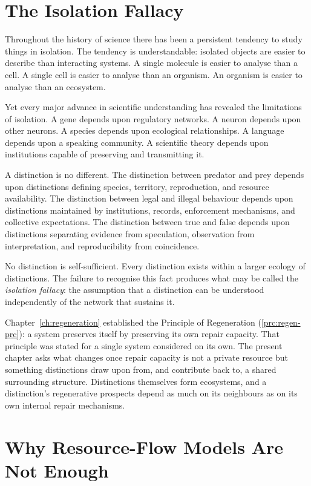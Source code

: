 \documentclass[12pt,twoside,openright]{book}
\begin{document}
\section{The Isolation Fallacy}
\label{sec:ch12-isolation}

Throughout the history of science there has been a
persistent tendency to study things in isolation. The
tendency is understandable: isolated objects are easier to
describe than interacting systems. A single molecule is
easier to analyse than a cell. A single cell is easier to
analyse than an organism. An organism is easier to analyse
than an ecosystem.

Yet every major advance in scientific understanding has
revealed the limitations of isolation. A gene depends upon
regulatory networks. A neuron depends upon other neurons. A
species depends upon ecological relationships. A language
depends upon a speaking community. A scientific theory
depends upon institutions capable of preserving and
transmitting it.

A distinction is no different. The distinction between
predator and prey depends upon distinctions defining
species, territory, reproduction, and resource
availability. The distinction between legal and illegal
behaviour depends upon distinctions maintained by
institutions, records, enforcement mechanisms, and
collective expectations. The distinction between true and
false depends upon distinctions separating evidence from
speculation, observation from interpretation, and
reproducibility from coincidence.

No distinction is self-sufficient. Every distinction exists
within a larger ecology of distinctions. The failure to
recognise this fact produces what may be called the
\emph{isolation fallacy}: the assumption that a distinction
can be understood independently of the network that
sustains it.

Chapter~\ref{ch:regeneration} established the Principle of
Regeneration (\cref{prc:regen-prc}): a system preserves
itself by preserving its own repair capacity. That principle
was stated for a single system considered on its own. The
present chapter asks what changes once repair capacity is
not a private resource but something distinctions draw upon
from, and contribute back to, a shared surrounding structure.
Distinctions themselves form ecosystems, and a distinction's
regenerative prospects depend as much on its neighbours as
on its own internal repair mechanisms.

\section{Why Resource-Flow Models Are Not Enough}
\label{sec:ch12-resource-flow}
\end{document}
